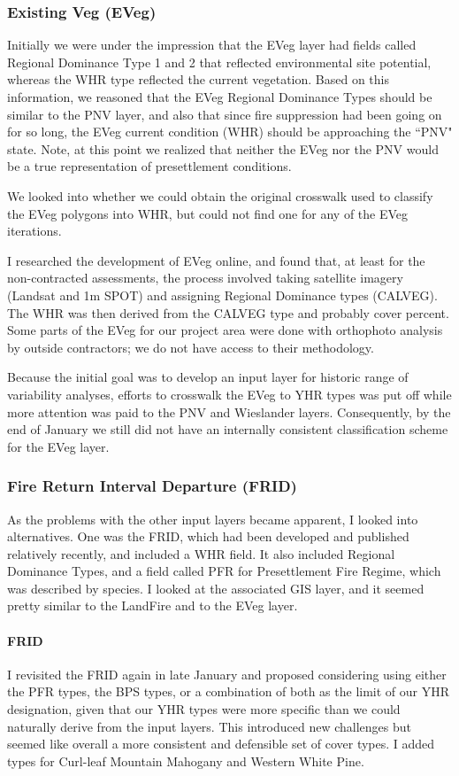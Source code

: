 \subsubsection{Existing Veg (EVeg)}
Initially we were under the impression that the EVeg layer had fields called Regional Dominance Type 1 and 2 that reflected environmental site potential, whereas the WHR type reflected the current vegetation. Based on this information, we reasoned that the EVeg Regional Dominance Types should be similar to the PNV layer, and also that since fire suppression had been going on for so long, the EVeg current condition (WHR) should be approaching the ``PNV" state. Note, at this point we realized that neither the EVeg nor the PNV would be a true representation of presettlement conditions.

We looked into whether we could obtain the original crosswalk used to classify the EVeg polygons into WHR, but could not find one for any of the EVeg iterations.

I researched the development of EVeg online, and found that, at least for the non-contracted assessments, the process involved taking satellite imagery (Landsat and 1m SPOT) and assigning Regional Dominance types (CALVEG). The WHR was then derived from the CALVEG type and probably cover percent. Some parts of the EVeg for our project area were done with orthophoto analysis by outside contractors; we do not have access to their methodology.

Because the initial goal was to develop an input layer for historic range of variability analyses, efforts to crosswalk the EVeg to YHR types was put off while more attention was paid to the PNV and Wieslander layers. Consequently, by the end of January we still did not have an internally consistent classification scheme for the EVeg layer.

\subsubsection{Fire Return Interval Departure (FRID)}
As the problems with the other input layers became apparent, I looked into alternatives. One was the FRID, which had been developed and published relatively recently, and included a WHR field. %
It also included Regional Dominance Types, and a field called PFR for Presettlement Fire Regime, which was described by species. I looked at the associated GIS layer, and it seemed pretty similar to the LandFire and to the EVeg layer.

\paragraph{FRID} I revisited the FRID again in late January and proposed considering using either the PFR types, the BPS types, or a combination of both as the limit of our YHR designation, given that our YHR types were more specific than we could naturally derive from the input layers. This introduced new challenges but seemed like overall a more consistent and defensible set of cover types. I added types for Curl-leaf Mountain Mahogany and Western White Pine.

